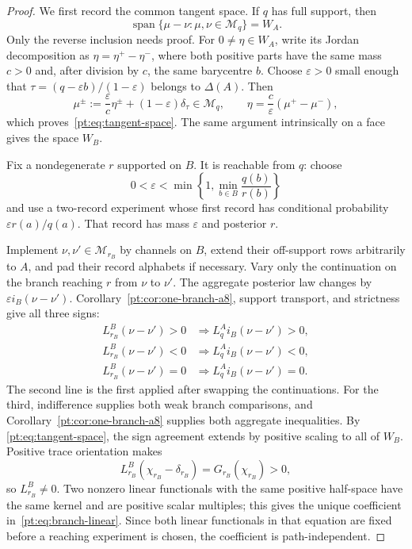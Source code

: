 \begin{proof}
We first record the common tangent space.  If $q$ has full support, then
\begin{equation}
 \operatorname{span}\{\mu-\nu:\mu,\nu\in\mathcal M_q\}=W_A.
\label{pt:eq:tangent-space}
\end{equation}
Only the reverse inclusion needs proof.  For $0\ne\eta\in W_A$, write its
Jordan decomposition as $\eta=\eta^+-\eta^-$, where both positive parts have
the same mass $c>0$ and, after division by $c$, the same barycentre $b$.
Choose $\varepsilon>0$ small enough that
$\tau=(q-\varepsilon b)/(1-\varepsilon)$ belongs to $\Delta(A)$.  Then
\[
 \mu^\pm:=\frac{\varepsilon}{c}\eta^\pm
          +(1-\varepsilon)\delta_\tau
 \in\mathcal M_q,
 \qquad
 \eta=\frac c\varepsilon(\mu^+-\mu^-),
\]
which proves~\eqref{pt:eq:tangent-space}.  The same argument intrinsically on
a face gives the space $W_B$.

Fix a nondegenerate $r$ supported on $B$.  It is reachable from $q$: choose
\[
 0<\varepsilon<\min\left\{1,
       \min_{b\in B}\frac{q(b)}{r(b)}\right\}
\]
and use a two-record experiment whose first record has conditional probability
$\varepsilon r(a)/q(a)$.  That record has mass $\varepsilon$ and posterior
$r$.

Implement $\nu,\nu'\in\mathcal M_{r_B}$ by channels on $B$, extend their
off-support rows arbitrarily to $A$, and pad their record alphabets if
necessary.  Vary only the continuation on the branch reaching $r$ from
$\nu$ to $\nu'$.  The aggregate posterior law changes by
$\varepsilon i_B(\nu-\nu')$.  Corollary~\ref{pt:cor:one-branch-a8}, support transport, and strictness give all
three signs:
\begin{align*}
 L_{r_B}^B(\nu-\nu')>0&\Longrightarrow
     L_q^A i_B(\nu-\nu')>0,\\
 L_{r_B}^B(\nu-\nu')<0&\Longrightarrow
     L_q^A i_B(\nu-\nu')<0,\\
 L_{r_B}^B(\nu-\nu')=0&\Longrightarrow
     L_q^A i_B(\nu-\nu')=0.
\end{align*}
The second line is the first applied after swapping the continuations.  For
the third, indifference supplies both weak branch comparisons, and
Corollary~\ref{pt:cor:one-branch-a8} supplies both aggregate inequalities.  By
\eqref{pt:eq:tangent-space}, the sign agreement extends by positive scaling
to all of $W_B$.  Positive trace orientation makes
\[
 L_{r_B}^B(\chi_{r_B}-\delta_{r_B})
 =G_{r_B}(\chi_{r_B})>0,
\]
so $L_{r_B}^B\ne0$.  Two nonzero linear functionals with the same positive
half-space have the same kernel and are positive scalar multiples; this gives
the unique coefficient in~\eqref{pt:eq:branch-linear}.  Since both linear
functionals in that equation are fixed before a reaching experiment is
chosen, the coefficient is path-independent.


\end{proof}
